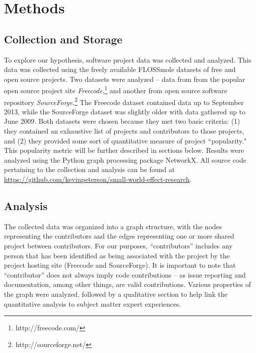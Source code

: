 \documentclass{proc}
\begin{document}
\section{Methods}

\subsection{Collection and Storage}
To explore our hypothesis, software project data was collected and analyzed. This data was collected using the freely available FLOSSmole\cite{floss2006} datasets of free and open source projects. Two datasets were analyzed -- data from from the popular open source project site \textit{Freecode},\footnote{http://freecode.com/} and another from open source software repository \textit{SourceForge}.\footnote{http://sourceforge.net/} The Freecode dataset contained data up to September 2013, while the SourceForge dataset was slightly older with data gathered up to June 2009. Both datasets were chosen because they met two basic criteria: (1) they contained an exhaustive list of projects and contributors to those projects, and (2) they provided some sort of quantitative measure of project ``popularity." This popularity metric will be further described in sections below. Results were analyzed using the Python graph processing package NetworkX\cite{hagberg-2008-exploring}. All source code pertaining to the collection and analysis can be found at \url{https://github.com/kevinpeterson/small-world-effect-research}.

\subsection{Analysis}
The collected data was organized into a graph structure, with the nodes representing the contributors and the edges representing one or more shared project between contributors. For our purposes, ``contributors'' includes any person that has been identified as being associated with the project by the project hosting site (Freecode and SourceForge). It is important to note that ``contributor'' does not always imply code contributions -- as issue reporting and documentation, among other things, are valid contributions. Various properties of the graph were analyzed, followed by a qualitative section to help link the quantitative analysis to subject matter expert experiences.
\end{document}
